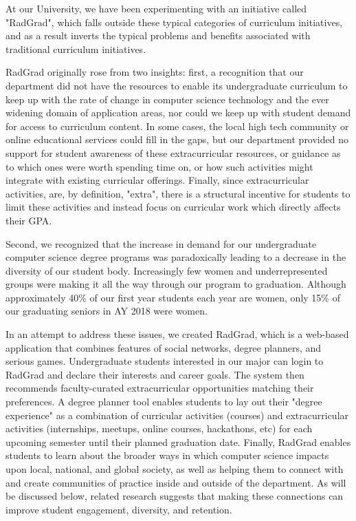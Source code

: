 \documentclass[acmsmall]{acmart}
\begin{document}
At our University, we have been experimenting with an initiative called "RadGrad", which falls outside these typical categories of curriculum initiatives, and as a result inverts the typical problems and benefits associated with traditional curriculum initiatives.

RadGrad originally rose from two insights: first, a recognition that our department did not have the resources to enable its undergraduate curriculum to keep up with the rate of change in computer science technology and the ever widening domain of application areas, nor could we keep up with student demand for access to curriculum content.  In some cases, the local high tech community or online educational services could fill in the gaps, but our department provided no support for student awareness of these extracurricular resources, or guidance as to which ones were worth spending time on, or how such activities might integrate with existing curricular offerings.  Finally, since extracurricular activities, are, by definition, "extra", there is a structural incentive for students to limit these activities and instead focus on curricular work which directly affects their GPA.

Second, we recognized that the increase in demand for our undergraduate computer science degree programs was paradoxically leading to a decrease in the diversity of our student body. Increasingly few women and underrepresented groups were making it all the way through our program to graduation. Although approximately 40\% of our first year students each year are women, only 15\% of our graduating seniors in AY 2018 were women.

In an attempt to address these issues, we created RadGrad, which is a web-based application that combines features of social networks, degree planners, and serious games.  Undergraduate students interested in our major can login to RadGrad and declare their interests and career goals. The system then recommends faculty-curated extracurricular opportunities matching their preferences. A degree planner tool enables students to lay out their "degree experience" as a combination of curricular activities (courses) and extracurricular activities (internships, meetups, online courses, hackathons, etc) for each upcoming semester until their planned graduation date. Finally, RadGrad enables students to learn about the broader ways in which computer science impacts upon local, national, and global society, as well as helping them to connect with and create communities of practice inside and outside of the department. As will be discussed below, related research suggests that making these connections can improve student engagement, diversity, and retention.
\end{document}
